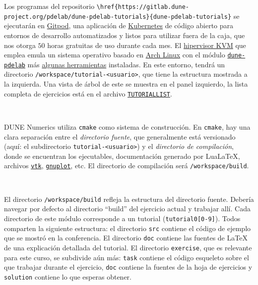 \documentclass[9pt,a3paper]{scrartcl}
\begin{document}
Los programas del repositorio
\verb!\href{https://gitlab.dune-project.org/pdelab/dune-pdelab-tutorials}{dune-pdelab-tutorials}!
se ejecutarán en \href{https://gitpod.io}{Gitpod}, una aplicación de
\href{https://kubernetes.io}{Kubernetes} de código abierto para
entornos de desarrollo automatizados y listos para utilizar fuera de
la caja, que nos otorga $50$ horas gratuitas de uso durante cada mes.
El \href{https://www.redhat.com/es/topics/virtualization/what-is-KVM}{hipervisor KVM}
que emplea emula un sistema operativo basado en
\href{http://archlinux.org}{Arch Linux} con el módulo
\href{https://aur.archlinux.org/packages/dune-pdelab}{\texttt{dune-pdelab}}
más \href{https://raw.githubusercontent.com/cpp-review-dune/introductory-review/main/src/Docker/DUNEPDELabTutorials.Dockerfile}{algunas herramientas}
instaladas.
En este entorno, tendrá un directorio
\verb!/workspace/tutorial-<usuario>!, que tiene la estructura
mostrada a la izquierda.
Una vista de árbol de este se muestra en el panel izquierdo, la lista
completa de ejercicios está en el archivo
\href{https://gitlab.dune-project.org/pdelab/dune-pdelab-tutorials/-/raw/master/TUTORIALLIST}{\texttt{TUTORIALLIST}}.

\

DUNE Numerics utiliza \verb!cmake! como sistema de construcción.
En \verb!cmake!, hay una clara separación entre el
\textit{directorio fuente}, que generalmente está versionado
(aquí: el subdirectorio \verb!tutorial-<usuario>!) y el
\textit{directorio de compilación}, donde se encuentran los
ejecutables, documentación generado por Lua\LaTeX{}, archivos
\href {https://vtk.org}{\texttt{vtk}},
\href{http://www.gnuplot.info}{\texttt{gnuplot}}, etc.
El directorio de compilación será \verb!/workspace/build!.

\

El directorio \verb!/workspace/build! refleja la estructura del
directorio fuente.
Debería navegar por defecto al directorio ``build'' del ejercicio
actual y trabajar allí.
Cada directorio de este módulo corresponde a un tutorial
(\verb!tutorial0[0-9]!).
Todos comparten la siguiente estructura: el directorio \verb!src!
contiene el código de ejemplo que se mostró en la conferencia.
El directorio \verb!doc! contiene las fuentes de \LaTeX{} de una
explicación detallada del tutorial.
El directorio \verb!exercise!, que es relevante para este curso, se
subdivide aún más: \verb!task! contiene el código esqueleto sobre el
que trabajar durante el ejercicio, \verb!doc! contiene la fuentes de
la hoja de ejercicios y \verb!solution! contiene lo que esperas
obtener.
\end{document}
